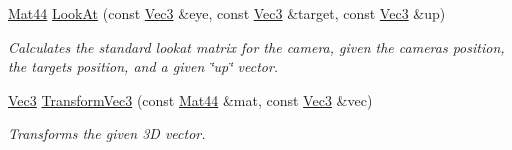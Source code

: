 \begin{DoxyCompactItemize}
\hyperlink{classgfxmath_1_1_mat44}{Mat44} \hyperlink{group___s_i_s_d_mat_math_gac420c9cd578ebe0b21c9db7757bc4c2d}{Look\+At} (const \hyperlink{classgfxmath_1_1_vec3}{Vec3} \&eye, const \hyperlink{classgfxmath_1_1_vec3}{Vec3} \&target, const \hyperlink{classgfxmath_1_1_vec3}{Vec3} \&up)
\begin{DoxyCompactList}\small\item\em Calculates the standard lookat matrix for the camera, given the camera\textquotesingle{}s position, the target\textquotesingle{}s position, and a given \char`\"{}up\char`\"{} vector. \end{DoxyCompactList}\item 
\hyperlink{classgfxmath_1_1_vec3}{Vec3} \hyperlink{group___s_i_s_d_mat_math_ga503b30792d41234b29089176be81cf6c}{Transform\+Vec3} (const \hyperlink{classgfxmath_1_1_mat44}{Mat44} \&mat, const \hyperlink{classgfxmath_1_1_vec3}{Vec3} \&vec)
\begin{DoxyCompactList}\small\item\em Transforms the given 3\+D vector. \end{DoxyCompactList}\end{DoxyCompactItemize}

